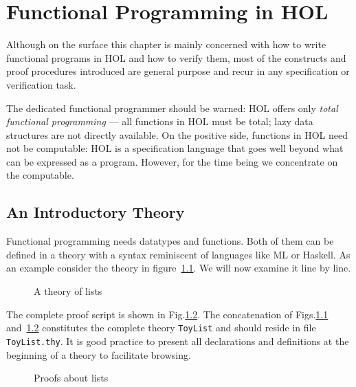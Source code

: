 \chapter{Functional Programming in HOL}

Although on the surface this chapter is mainly concerned with how to write
functional programs in HOL and how to verify them, most of the
constructs and proof procedures introduced are general purpose and recur in
any specification or verification task.

The dedicated functional programmer should be warned: HOL offers only
\emph{total functional programming} --- all functions in HOL must be total;
lazy data structures are not directly available. On the positive side,
functions in HOL need not be computable: HOL is a specification language that
goes well beyond what can be expressed as a program. However, for the time
being we concentrate on the computable.

\section{An Introductory Theory}
\label{sec:intro-theory}

Functional programming needs datatypes and functions. Both of them can be
defined in a theory with a syntax reminiscent of languages like ML or
Haskell. As an example consider the theory in figure~\ref{fig:ToyList}.
We will now examine it line by line.

\begin{figure}[htbp]
\begin{ttbox}\makeatother
\end{ttbox}
\caption{A theory of lists}
\label{fig:ToyList}
\end{figure}

{\makeatother}

The complete proof script is shown in Fig.\ts\ref{fig:ToyList-proofs}. The
concatenation of Figs.\ts\ref{fig:ToyList} and~\ref{fig:ToyList-proofs}
constitutes the complete theory \texttt{ToyList} and should reside in file
\texttt{ToyList.thy}. It is good practice to present all declarations and
definitions at the beginning of a theory to facilitate browsing.

\begin{figure}[htbp]
\begin{ttbox}\makeatother
\end{ttbox}
\caption{Proofs about lists}
\label{fig:ToyList-proofs}
\end{figure}

